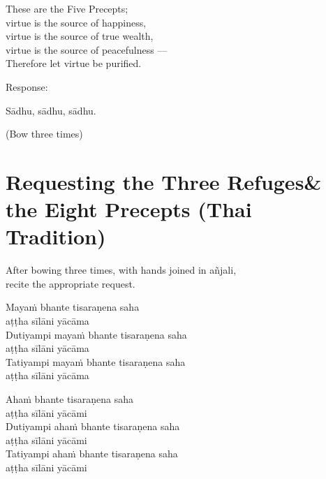 \begin{english}
  These are the Five Precepts;\\
  virtue is the source of happiness,\\
  virtue is the source of true wealth,\\
  virtue is the source of peacefulness ---\\
  Therefore let virtue be purified.
\end{english}

\begin{instruction}
  Response:
\end{instruction}

Sādhu, sādhu, sādhu.

\begin{instruction}
  (Bow three times)
\end{instruction}

\ifhandbookedition
\clearpage
\fi

\section[Three Refuges \& the Eight Precepts]{Requesting the Three Refuges\newline \& the Eight Precepts (Thai Tradition)}

\label{eight-precepts}

\begin{instruction}
  After bowing three times, with hands joined in añjali,\\
  recite the appropriate request.
\end{instruction}

\ifhandbookedition
\enlargethispage{\baselineskip}
\fi


Mayaṁ bhante tisaraṇena saha\\\vin aṭṭha sīlāni yācāma\\
Dutiyampi mayaṁ bhante tisaraṇena saha\\\vin aṭṭha sīlāni yācāma\\
Tatiyampi mayaṁ bhante tisaraṇena saha\\\vin aṭṭha sīlāni yācāma


Ahaṁ bhante tisaraṇena saha\\\vin aṭṭha sīlāni yācāmi\\
Dutiyampi ahaṁ bhante tisaraṇena saha\\\vin aṭṭha sīlāni yācāmi\\
Tatiyampi ahaṁ bhante tisaraṇena saha\\\vin aṭṭha sīlāni yācāmi

